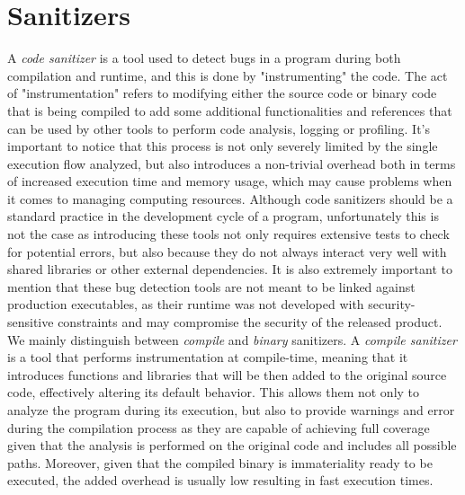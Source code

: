 \section{Sanitizers} \label{sanitizers}
A \textit{code sanitizer} is a tool used to detect bugs in a program during both compilation and runtime, and this is done by "instrumenting" the code.
\newline
The act of "instrumentation" refers to modifying either the source code or binary code that is being compiled to add some additional functionalities and references that can be used by other tools to perform code analysis, logging or profiling.
\newline
It's important to notice that this process is not only severely limited by the single execution flow analyzed, but also introduces a non-trivial overhead both in terms of increased execution time and memory usage, which may cause problems when it comes to managing computing resources.
\newline \newline
Although code sanitizers should be a standard practice in the development cycle of a program, unfortunately this is not the case as introducing these tools not only requires extensive tests to check for potential errors, but also because they do not always interact very well with shared libraries or other external dependencies.
\newline
It is also extremely important to mention that these bug detection tools are not meant to be linked against production executables, as their runtime was not developed with security-sensitive constraints and may compromise the security of the released product. \cite{asan_docs}\cite{msan_docs}\cite{ubsan_docs}
\newline \newline
We mainly distinguish between \textit{compile} and \textit{binary} sanitizers.
\newline
A \textit{compile sanitizer} is a tool that performs instrumentation at compile-time, meaning that it introduces functions and libraries that will be then added to the original source code, effectively altering its default behavior. This allows them not only to analyze the program during its execution, but also to provide warnings and error during the compilation process as they are capable of achieving full coverage given that the analysis is performed on the original code and includes all possible paths. Moreover, given that the compiled binary is immateriality ready to be executed, the added overhead is usually low resulting in fast execution times.
